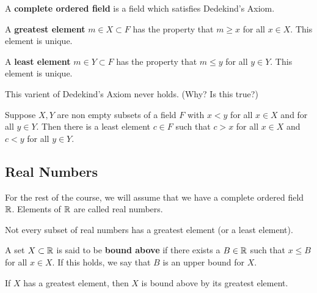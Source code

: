 \begin{definition}
	A {\bfseries complete ordered field} is a field which satisfies Dedekind's 
	Axiom.
\end{definition}

\begin{definition}
	A {\bfseries greatest element} $m \in X \subset F$ has the property that
	$m \geq x$ for all $x \in X$. This element is unique.
\end{definition}

\begin{definition}
	A {\bfseries least element} $m \in Y \subset F$ has the property that
	$m \leq y$ for all $y \in Y$. This element is unique.
\end{definition}

\begin{remark}
	This varient of Dedekind's Axiom never holds. (Why? Is this true?)

	Suppose $X,Y$ are non empty subsets of a field $F$ with $x < y$ for all $x \in X$
	and for all $y \in Y$. Then there is a least element $c \in F$ such that 
	$c > x$ for all $x \in X$ and $c < y$ for all $y \in Y$.
\end{remark}


\subsection{Real Numbers}

\begin{remark}
	For the rest of the course, we will assume that we have a complete ordered
	field $\mathbb{R}$. Elements of $\mathbb{R}$ are called real numbers.
\end{remark}

\begin{prop}
	Not every subset of real numbers has a greatest element (or a least element).
\end{prop}

\begin{definition}
 	A set $X \subset \mathbb{R}$ is said to be {\bfseries bound above} if there exists
 	a $B \in \mathbb{R}$ such that $x \leq B$ for all $x \in X$. If this holds, we say
 	that $B$ is an upper bound for $X$.

 	If $X$ has a greatest element, then $X$ is bound above by its greatest
 	element.
\end{definition}

